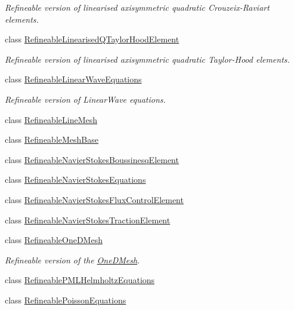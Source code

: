 \begin{DoxyCompactItemize}
\begin{DoxyCompactList}\small\item\em Refineable version of linearised axisymmetric quadratic Crouzeix-\/\+Raviart elements. \end{DoxyCompactList}\item 
class \hyperlink{classoomph_1_1RefineableLinearisedQTaylorHoodElement}{Refineable\+Linearised\+Q\+Taylor\+Hood\+Element}
\begin{DoxyCompactList}\small\item\em Refineable version of linearised axisymmetric quadratic Taylor-\/\+Hood elements. \end{DoxyCompactList}\item 
class \hyperlink{classoomph_1_1RefineableLinearWaveEquations}{Refineable\+Linear\+Wave\+Equations}
\begin{DoxyCompactList}\small\item\em Refineable version of Linear\+Wave equations. \end{DoxyCompactList}\item 
class \hyperlink{classoomph_1_1RefineableLineMesh}{Refineable\+Line\+Mesh}
\item 
class \hyperlink{classoomph_1_1RefineableMeshBase}{Refineable\+Mesh\+Base}
\item 
class \hyperlink{classoomph_1_1RefineableNavierStokesBoussinesqElement}{Refineable\+Navier\+Stokes\+Boussinesq\+Element}
\item 
class \hyperlink{classoomph_1_1RefineableNavierStokesEquations}{Refineable\+Navier\+Stokes\+Equations}
\item 
class \hyperlink{classoomph_1_1RefineableNavierStokesFluxControlElement}{Refineable\+Navier\+Stokes\+Flux\+Control\+Element}
\item 
class \hyperlink{classoomph_1_1RefineableNavierStokesTractionElement}{Refineable\+Navier\+Stokes\+Traction\+Element}
\item 
class \hyperlink{classoomph_1_1RefineableOneDMesh}{Refineable\+One\+D\+Mesh}
\begin{DoxyCompactList}\small\item\em Refineable version of the \hyperlink{classoomph_1_1OneDMesh}{One\+D\+Mesh}. \end{DoxyCompactList}\item 
class \hyperlink{classoomph_1_1RefineablePMLHelmholtzEquations}{Refineable\+P\+M\+L\+Helmholtz\+Equations}
\item 
class \hyperlink{classoomph_1_1RefineablePoissonEquations}{Refineable\+Poisson\+Equations}

\end{DoxyCompactItemize}
